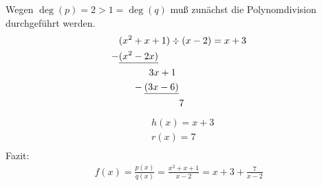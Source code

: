 Wegen $ \deg(p)=2>1=\deg(q) $ muß  zunächst die Polynomdivision durchgeführt werden.\\
\begin{align*}
&(x^2+x+1)\div(x-2)=x+3\\
-&\underline{(x^2-2x)}\\
&\hspace{1.1cm} 3x+1\\
&\hspace{0.5cm}-\underline{(3x-6)}\\
&\hspace{2.2cm}7\\
\end{align*}
\begin{align*}
&h(x)=x+3\\
&r(x)=7\\
\end{align*}
Fazit:\\
\begin{align*}
f(x)=\frac{p(x)}{q(x)}=\frac{x^2+x+1}{x-2}=x+3+\frac{7}{x-2}\\
\end{align*}
